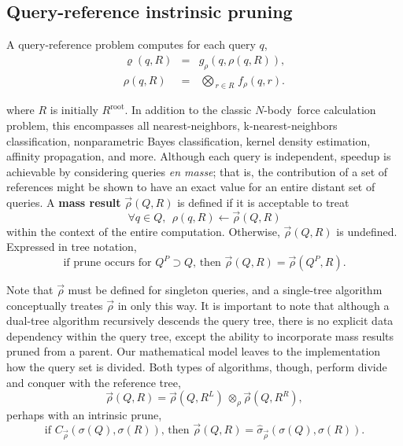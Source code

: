 \documentclass[twoside,leqno,twocolumn]{article}
\newcommand{\summary}{\hat{\sigma}}
\newcommand{\defterm}[1]{{\bf #1}}
\newcommand{\nbody}{$N$-body}
\newcommand{\kdroot}[1]{#1^{\text{root}}}
\newcommand{\kdleft}[1]{#1^{\!L}}
\newcommand{\kdright}[1]{#1^{\!R}}
\newcommand{\kdparent}[1]{#1^{\!P}}
\newcommand{\nameOp}[2]{\mathop{#1\nolimits\!\!_{#2}}}
\newcommand{\nameop}[2]{{\scriptstyle\:}#1_{\!#2}}
\newcommand{\myOp}[1]{\nameOp{\bigotimes}{#1}}
\newcommand{\myop}[1]{\nameop{\otimes}{#1}}
\newcommand{\letterqr}{\rho}
\newcommand{\outqr}{\varrho}
\newcommand{\inqr}{\rho}
\newcommand{\Opqr}{\myOp{\letterqr}}
\newcommand{\opqr}{\myop{\letterqr}}
\newcommand{\fqr}{f_{\!\letterqr}}
\newcommand{\gqr}{g_{\!\letterqr}}
\newcommand{\letterqrv}{\vec{\rho}}
\newcommand{\inqrv}{\vec{\rho}}
\newcommand{\deltaqrv}{\summary_{\!\letterqrv}}
\newcommand{\canpruneqrv}{C_{\!\letterqrv}}
\newcommand{\outstat}{\sigma}
\begin{document}
\subsection{Query-reference instrinsic pruning}
A query-reference problem computes for each query $q$,
\begin{eqnarray}
\outqr(q, R) &=& \gqr(q, \inqr(q, R)),
\\
\inqr(q, R) &=& \Opqr_{r \in R} \fqr(q, r).
\label{eqn:qrdef}
\end{eqnarray}

\noindent where $R$ is initially $\kdroot{R}$.
In addition to the classic \nbody\ force calculation problem, this encompasses all nearest-neighbors, k-nearest-neighbors classification, nonparametric Bayes classification, kernel density estimation, affinity propagation, and more.
Although each query is independent, speedup is achievable by considering queries {\it en masse}; that is, the contribution of a set of references might be shown to have an exact value for an entire distant set of queries.
A \defterm{mass result} $\inqrv(Q, R)$ is defined if it is acceptable to treat
\[
\forall q \in Q,~~ \inqr(q, R) \gets \inqrv(Q, R)
\]
\noindent
within the context of the entire computation.
Otherwise, $\inqrv(Q,R)$ is undefined.
Expressed in tree notation,
\begin{equation}
\text{if prune occurs for } \kdparent{Q} \supset Q \text{, then } \inqrv(Q, R) = \inqrv(\kdparent{Q}, R).
\label{eqn:qrvparent}
\end{equation}

\noindent
Note that $\inqrv$ must be defined for singleton queries, and a single-tree algorithm conceptually treates $\inqrv$ in only this way.
It is important to note that although a dual-tree algorithm recursively descends the query tree, there is no explicit data dependency within the query tree, except the ability to incorporate mass results pruned from a parent.
Our mathematical model leaves to the implementation how the query set is divided.
Both types of algorithms, though, perform divide and conquer with the reference tree,
\begin{equation}
\inqrv(Q, R) = \inqrv(Q, \kdleft{R}) \opqr \inqrv(Q, \kdright{R}),
\label{eqn:qrvcompose}
\end{equation}
\noindent perhaps with an intrinsic prune,
\begin{equation}
\text{if } \canpruneqrv(\outstat(Q), \outstat(R)) \text{, then } \inqrv(Q, R) = \deltaqrv(\outstat(Q), \outstat(R)).
\label{eqn:qrvprune}
\end{equation}
\end{document}

